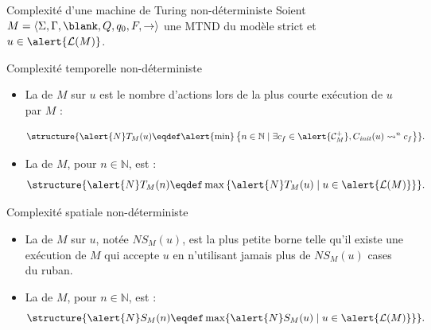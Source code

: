 
\begingroup

\begin{frame}{Complexité d'une machine de Turing non-déterministe}
  Soient $M=\langle \Sigma, \Gamma, \blank, Q, q_0, F, \rightarrow \rangle$ une \alert{MTND} du modèle strict et $u \in \alert{\mathcal{L}(M)}$.

  \begin{block}{Complexité temporelle non-déterministe}
    \begin{itemize}
    \item\vspace{-1mm} La  de $M$ sur $u$ est le nombre d'actions lors de \alert{la plus courte} exécution de $u$ par $M$ :

      \vspace{-2mm}
      $$\structure{\alert{N}T_M(u) \eqdef \alert{\min}\left\{n \in \mathbb{N} \mid \exists c_f \in \alert{\mathcal{C}_M^+}, C_{\mathit{init}}(u) \leadsto^n c_f\right\}}.$$ 

    \item\vspace{-1mm} La  de $M$, pour $n\in \mathbb{N}$, est : \\

      \vspace{-2mm}
      $$\structure{\alert{N}T_M(n) \eqdef \max \left\{\alert{N}T_M(u) \mid u \in \alert{\mathcal{L}(M)} \right\}}.$$ 
    \end{itemize}
  \end{block}

  \vspace{-2mm}
  \begin{block}{Complexité spatiale non-déterministe}
    \begin{itemize}
    \item La  de $M$ sur $u$, notée \alert{$NS_M(u)$},
      est \alert{la plus petite borne} telle qu'\alert{il existe une exécution} de $M$ qui accepte $u$ en \alert{n'utilisant
      jamais plus de $NS_M(u)$ cases} du ruban.
      
    \item\vspace{-1mm} La  de $M$, pour $n\in \mathbb{N}$, est : \\

      \vspace{-2mm}
      $$\structure{\alert{N}S_M(n) \eqdef \max \{\alert{N}S_M(u) \mid u \in \alert{\mathcal{L}(M)} \}}.$$ 
    \end{itemize}
  \end{block}

\end{frame}

\endgroup
\endinput
